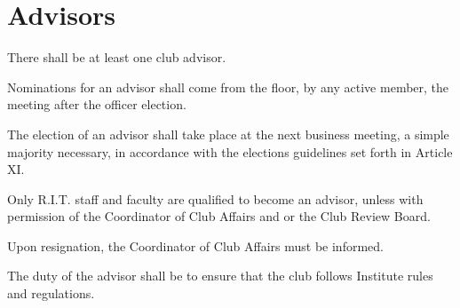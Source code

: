 \section{Advisors}
\begin{subroutines}
\item There shall be at least one club advisor.
\item Nominations for an advisor shall come from the floor, by any active member, the meeting after the officer election.
\item The election of an advisor shall take place at the next business meeting, a simple majority necessary, in accordance with the elections guidelines set forth in Article XI.
\item Only R.I.T. staff and faculty are qualified to become an advisor, unless with permission of the Coordinator of Club Affairs and or the Club Review Board.
\item Upon resignation, the Coordinator of Club Affairs must be informed.
\item The duty of the advisor shall be to ensure that the club follows Institute rules and regulations.
\end{subroutines}

